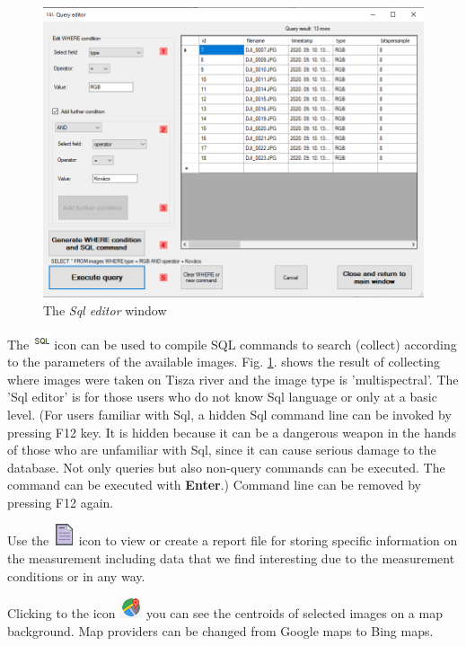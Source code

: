 \documentclass[a4paper,12pt]{article}
\begin{document}
\begin{figure}
	\centering
	\includegraphics[width=12cm]{sqleditor.png}
	\caption{The \textit{Sql editor} window}
	\label{fig:sqleditor}
\end{figure}

The \includegraphics [width = 0.5cm] {sql.png} icon can be used to compile SQL commands to search (collect) according to the parameters of the available images. Fig. \ref {fig:sqleditor}. shows the result of collecting where images were taken on Tisza river and the image type is 'multispectral'. The 'Sql editor' is for those users who do not know Sql language or only at a basic level.
(For users familiar with Sql, a hidden Sql command line can be invoked by pressing F12 key. It is hidden because it can be a dangerous weapon in the hands of those who are unfamiliar with Sql, since it can cause serious damage to the database. Not only queries but also non-query commands can be executed. The command can be executed with \textbf {Enter}.) Command line can be removed by pressing F12 again.

Use the \includegraphics [width = 0.5 cm] {sheet.png} icon to view or create a report file for storing specific information on the measurement including data that we find interesting due to the measurement conditions or in any way. 

Clicking to the icon \includegraphics{mapviewer_ikon.png} you can see the centroids of selected images on a map background. Map providers can be changed from Google maps to Bing maps.
\end{document}
